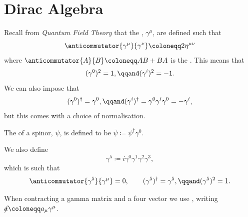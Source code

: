 \documentclass[fleqn]{NotesClass}
\newcommand*{\course}[1]{\textit{#1}}
\newcommand{\diracadjoint}[1]{\overbar{#1}}
\newcommand{\hermit}{\dagger}
\newcommand{\minkowskiMetric}{\eta}
\begin{document}
    \section{Dirac Algebra}
    Recall from \course{Quantum Field Theory} that the , \(\gamma^\mu\), are defined such that
    \begin{equation}
        \anticommutator{\gamma^\mu}{\gamma^\nu} \coloneqq 2\minkowskiMetric^{\mu\nu}
    \end{equation}
    where \(\anticommutator{A}{B} \coloneqq AB + BA\) is the .
    This means that
    \begin{equation}
        (\gamma^0)^2 = 1, \qqand (\gamma^i)^2 = -1.
    \end{equation}
    We can also impose that
    \begin{equation}
        (\gamma^0)^{\hermit} = \gamma^{0}, \qqand (\gamma^i)^{\hermit} = \gamma^0 \gamma^i \gamma^0 = -\gamma^i,
    \end{equation}
    but this comes with a choice of normalisation.
    
    The  of a spinor, \(\psi\), is defined to be \(\diracadjoint{\psi} \coloneqq \psi^\hermit \gamma^0\).
    
    We also define
    \begin{equation}
        \gamma^5 \coloneqq i\gamma^0\gamma^1\gamma^2\gamma^3,
    \end{equation}
    which is such that
    \begin{equation}
        \anticommutator{\gamma^5}{\gamma^\mu} = 0, \qquad (\gamma^5)^\hermit = \gamma^5, \qqand (\gamma^5)^2 = 1.
    \end{equation}
    
    When contracting a gamma matrix and a four vector we use , writing \(\slashed{a} \coloneqq a_\mu \gamma^\mu\).
    
\end{document}
